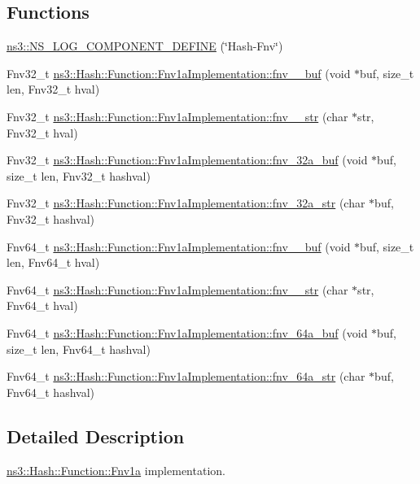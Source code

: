 \subsection*{Functions}
\begin{DoxyCompactItemize}
\item 
\hyperlink{namespacens3_aeec0a493c7267ec807a4a457184b0429}{ns3\+::\+N\+S\+\_\+\+L\+O\+G\+\_\+\+C\+O\+M\+P\+O\+N\+E\+N\+T\+\_\+\+D\+E\+F\+I\+NE} (\char`\"{}Hash-\/Fnv\char`\"{})
\item 
Fnv32\+\_\+t \hyperlink{group__hash__fnv_gadaf15dca2b23a80e5cf6ce781da4906c}{ns3\+::\+Hash\+::\+Function\+::\+Fnv1a\+Implementation\+::fnv\+\_\+\_\+buf} (void $\ast$buf, size\+\_\+t len, Fnv32\+\_\+t hval)
\item 
Fnv32\+\_\+t \hyperlink{group__hash__fnv_ga468252c78bf386134ad329d81d4d6eea}{ns3\+::\+Hash\+::\+Function\+::\+Fnv1a\+Implementation\+::fnv\+\_\+\_\+str} (char $\ast$str, Fnv32\+\_\+t hval)
\item 
Fnv32\+\_\+t \hyperlink{group__hash__fnv_gaf1f4a73d8e353e33a70f6a0e9cb44f9b}{ns3\+::\+Hash\+::\+Function\+::\+Fnv1a\+Implementation\+::fnv\+\_\+32a\+\_\+buf} (void $\ast$buf, size\+\_\+t len, Fnv32\+\_\+t hashval)
\item 
Fnv32\+\_\+t \hyperlink{group__hash__fnv_ga6b0ed3c48edfd96df1222d7a414ef6d1}{ns3\+::\+Hash\+::\+Function\+::\+Fnv1a\+Implementation\+::fnv\+\_\+32a\+\_\+str} (char $\ast$buf, Fnv32\+\_\+t hashval)
\item 
Fnv64\+\_\+t \hyperlink{group__hash__fnv_gab250be2cf62835a4221cd58bf8cb136c}{ns3\+::\+Hash\+::\+Function\+::\+Fnv1a\+Implementation\+::fnv\+\_\+\_\+buf} (void $\ast$buf, size\+\_\+t len, Fnv64\+\_\+t hval)
\item 
Fnv64\+\_\+t \hyperlink{group__hash__fnv_ga5de54a6ab9399b2e6780a3867889c568}{ns3\+::\+Hash\+::\+Function\+::\+Fnv1a\+Implementation\+::fnv\+\_\+\_\+str} (char $\ast$str, Fnv64\+\_\+t hval)
\item 
Fnv64\+\_\+t \hyperlink{group__hash__fnv_ga61da2150923405756a0fd5ae19170dd2}{ns3\+::\+Hash\+::\+Function\+::\+Fnv1a\+Implementation\+::fnv\+\_\+64a\+\_\+buf} (void $\ast$buf, size\+\_\+t len, Fnv64\+\_\+t hashval)
\item 
Fnv64\+\_\+t \hyperlink{group__hash__fnv_gaa404ed488258e9943aa51a90e6dea631}{ns3\+::\+Hash\+::\+Function\+::\+Fnv1a\+Implementation\+::fnv\+\_\+64a\+\_\+str} (char $\ast$buf, Fnv64\+\_\+t hashval)
\end{DoxyCompactItemize}


\subsection{Detailed Description}
\hyperlink{classns3_1_1Hash_1_1Function_1_1Fnv1a}{ns3\+::\+Hash\+::\+Function\+::\+Fnv1a} implementation. 

